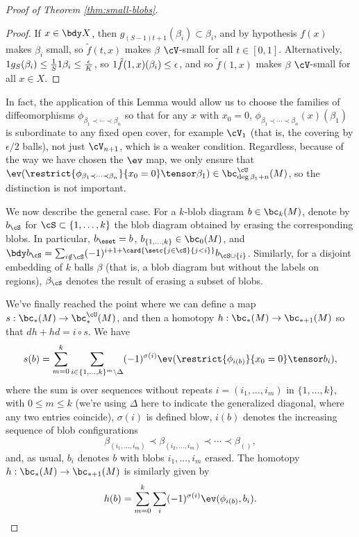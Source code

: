 \begin{proof}[Proof of Theorem \ref{thm:small-blobs}]
\begin{proof}
If $x \in \bdy X$, then $g_{(S-1)t+1}(\beta_i) \subset \beta_i$, and by hypothesis $f(x)$ makes $\beta_i$ small, so $\tilde{f}(t, x)$ makes $\beta$ $\cV$-small for all $t \in [0,1]$. Alternatively, $1 g_S(\beta_i) \leq \frac{1}{S} 1 \beta_i \leq \frac{\epsilon}{K}$, so $1 \tilde{f}(1,x)(\beta_i) \leq \epsilon$, and so $\tilde{f}(1,x)$ makes $\beta$ $\cV$-small for all $x \in X$.
\end{proof}

In fact, the application of this Lemma would allow us to choose the families of diffeomorphisms $\phi_{\beta_1 \prec \cdots \prec \beta_n}$ so that for any $x$ with $x_0 = 0$, $\phi_{\beta_1 \prec \cdots \prec \beta_n}(x)(\beta_1)$ is subordinate to any fixed open cover, for example $\cV_1$ (that is, the covering by $\epsilon/2$ balls), not just $\cV_{n+1}$, which is a weaker condition. Regardless, because of the way we have chosen the $\ev$ map, we only ensure that $\ev(\restrict{\phi_{\beta_1 \prec \cdots \prec \beta_n}}{x_0 = 0} \tensor \beta_1) \in \bc_{\deg \beta_1 + n}^{\cU}(M)$, so the distinction is not important.

We now describe the general case. For a $k$-blob diagram $b \in \bc_k(M)$, denote by $b_\cS$ for $\cS \subset \{1, \ldots, k\}$ the blob diagram obtained by erasing the corresponding blobs. In particular, $b_\eset = b$, $b_{\{1,\ldots,k\}} \in \bc_0(M)$, and $\bdy b_\cS = \sum_{i \notin \cS} (-1)^{i+1+\card{\setc{j \in \cS}{j < i}}}  b_{\cS \cup \{i\}}$.
Similarly, for a disjoint embedding of $k$ balls $\beta$ (that is, a blob diagram but without the labels on regions), $\beta_\cS$ denotes the result of erasing a subset of blobs. 

\newcommand{\length}[1]{\operatorname{length}(#1)}

We've finally reached the point where we can define a map $s: \bc_*(M) \to \bc^{\cU}_*(M)$, and then a homotopy $h:\bc_*(M) \to \bc_{*+1}(M)$ so that $dh+hd=i\circ s$.  We have
$$s(b) = \sum_{m=0}^{k} \sum_{i \in \{1, \ldots, k\}^{m} \setminus \Delta} (-1)^{\sigma(i)}  \ev(\restrict{\phi_{i(b)}}{x_0 = 0} \tensor b_i),$$
where the sum is over sequences without repeats $i=(i_1,\ldots,i_m)$ in $\{1,\ldots,k\}$, with $0\leq m \leq k$ (we're using $\Delta$ here to indicate the generalized diagonal, where any two entries coincide), $\sigma(i)$ is defined blow, $i(b)$ denotes the increasing sequence of blob configurations
$$\beta_{(i_1,\ldots,i_m)} \prec \beta_{(i_2,\ldots,i_m)} \prec \cdots \prec \beta_{()},$$
and, as usual, $b_i$ denotes $b$ with blobs $i_1, \ldots, i_m$ erased.
The homotopy $h:\bc_*(M) \to \bc_{*+1}(M)$ is similarly given by
$$h(b) = \sum_{m=0}^{k} \sum_{i} (-1)^{\sigma(i)} \ev(\phi_{i(b)}, b_i).$$


\end{proof}
